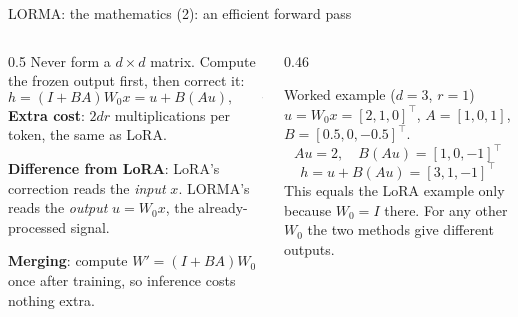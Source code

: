 \documentclass[aspectratio=169,11pt]{beamer}
\begin{document}
\begin{frame}{LORMA: the mathematics (2): an efficient forward pass}
  \begin{columns}[T]
    \begin{column}{0.5\textwidth}
      \small
      Never form a $d\times d$ matrix. Compute the frozen output first, then correct it:
      \[
        h=(I+BA)W_0x = u + B(Au),\qquad u=W_0x
      \]
      \textbf{Extra cost}: $2dr$ multiplications per token, the same as LoRA.
      \vspace{1mm}

      \textbf{Difference from LoRA}: LoRA's correction reads the \emph{input} $x$. LORMA's reads the \emph{output} $u=W_0x$, the already-processed signal.
      \vspace{1mm}

      \textbf{Merging}: compute $W'=(I+BA)W_0$ once after training, so inference costs nothing extra.
    \end{column}
    \begin{column}{0.46\textwidth}
      \begin{exampleblock}{Worked example ($d=3$, $r=1$)}
        \small
        $u=W_0x=[2,1,0]^\top$, $A=[1,0,1]$, $B=[0.5,0,-0.5]^\top$.
        \[
          Au=2,\quad B(Au)=[1,0,-1]^\top
        \]
        \[
          h=u+B(Au)=[3,1,-1]^\top
        \]
        This equals the LoRA example only because $W_0=I$ there. For any other $W_0$ the two methods give different outputs.
      \end{exampleblock}
    \end{column}
  \end{columns}
\end{frame}
\end{document}
